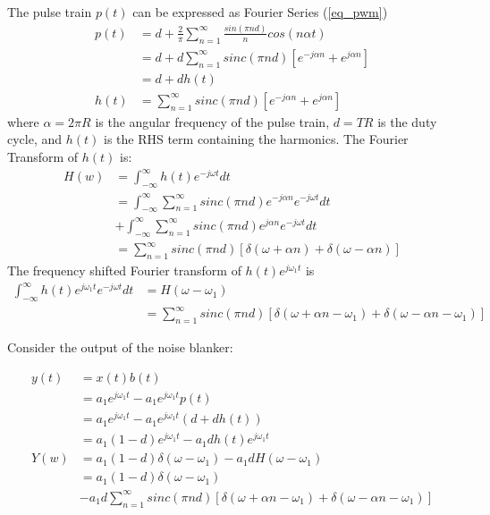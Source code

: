 \documentclass{article}
\begin{document}
The pulse train $p(t)$ can be expressed as Fourier Series (\ref{eq_pwm})
\begin{equation}
\begin{split}
p(t) &= d+\frac{2}{\pi} \sum_{n=1}^{\infty} \frac{sin(\pi n d)}{n}cos(n \alpha t) \\
     &= d + d \sum_{n=1}^{\infty} sinc(\pi n d) \left[ e^{-j\alpha n} + e^{j \alpha n} \right] \\
     &= d + d h(t) \\
h(t) &= \sum_{n=1}^{\infty} sinc(\pi n d) \left[ e^{-j\alpha n} + e^{j \alpha n} \right]  
\end{split}
\end{equation}
where $\alpha=2 \pi R$ is the angular frequency of the pulse train, $d=TR$ is the duty cycle, and $h(t)$ is the RHS term containing the harmonics.  The Fourier Transform of $h(t)$ is:
\begin{equation}
\begin{split}
H(w) &= \int_{-\infty}^{\infty}h(t)e^{-j \omega t}dt \\
     &= \int_{-\infty}^{\infty} \sum_{n=1}^{\infty} sinc(\pi n d) e^{-j\alpha n}e^{-j \omega t}dt \\
     &+ \int_{-\infty}^{\infty} \sum_{n=1}^{\infty} sinc(\pi n d) e^{j\alpha n}e^{-j \omega t}dt \\
     &= \sum_{n=1}^{\infty} sinc(\pi n d) \left[ \delta(\omega + \alpha n) + \delta(\omega - \alpha n) \right]
\end{split}
\end{equation}
The frequency shifted Fourier transform of $h(t)e^{j \omega_1 t}$ is
\begin{equation}
\begin{split}
\int_{-\infty}^{\infty} h(t)e^{j \omega_1 t} e^{-j \omega t}dt &= H(\omega-\omega_1) \\
  &= \sum_{n=1}^{\infty} sinc(\pi n d) \left[ \delta(\omega + \alpha n - \omega_1) + \delta(\omega - \alpha n - \omega_1) \right]
\end{split}
\end{equation}

Consider the output of the noise blanker:

\begin{equation}
\begin{split}
y(t) &= x(t)b(t) \\
     &= a_1 e^{j \omega_1 t} - a_1 e^{j \omega_1 t}p(t) \\
     &= a_1 e^{j \omega_1 t} - a_1 e^{j \omega_1 t}(d + dh(t)) \\    
     &= a_1 (1-d) e^{j \omega_1 t} - a_1 d h(t) e^{j \omega_1 t} \\    
Y(w) &= a_1 (1-d) \delta(\omega - \omega_1) - a_1 d H(\omega-\omega_1) \\
     &= a_1 (1-d) \delta(\omega - \omega_1) \\
     &- a_1 d \sum_{n=1}^{\infty} sinc(\pi n d) \left[ \delta(\omega + \alpha n - \omega_1) + \delta(\omega - \alpha n - \omega_1) \right]
\end{split}
\end{equation} 
\end{document}
